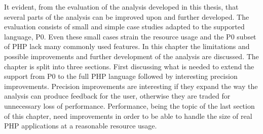 It evident, from the evaluation of the analysis developed in this thesis, that several parts of the analysis can be improved upon and further developed. The evaluation consists of small and simple case studies adapted to the supported language, P0. Even these small cases strain the resource usage and the P0 subset of PHP lack many commonly used features. In this chapter the limitations and possible improvements and further development of the analysis are discussed. The chapter is split into three sections. First discussing what is needed to extend the support from P0 to the full PHP language followed by interesting precision improvements. Precision improvements are interesting if they expand the way the analysis can produce feedback for the user, otherwise they are traded for unnecessary loss of performance. Performance, being the topic of the last section of this chapter, need improvements in order to be able to handle the size of real PHP applications at a reasonable resource usage.